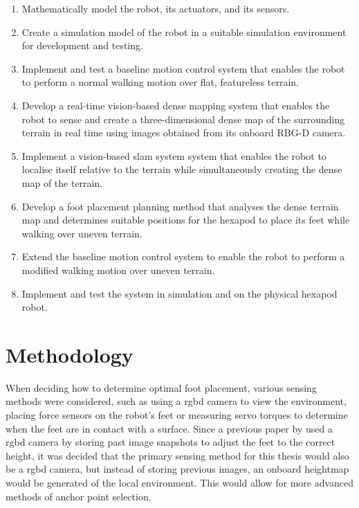     \begin{enumerate}
        \item Mathematically model the robot, its actuators, and its sensors.
        \item Create a simulation model of the robot in a suitable simulation environment for development and testing.
        \item Implement and test a baseline motion control system that enables the robot to
        perform a normal walking motion over flat, featureless terrain.
        \item Develop a real-time vision-based dense mapping system that enables the robot to sense and create a three-dimensional 
        dense map of the surrounding terrain in real time using images obtained from its onboard RBG-D camera.
        \item Implement a vision-based \ac{slam} system system that enables the robot to localise itself relative to the terrain
        while simultaneously creating the dense map of the terrain.
        \item Develop a foot placement planning method that analyses the dense terrain map and determines suitable positions
        for the hexapod to place its feet while walking over uneven terrain.
        \item Extend the baseline motion control system to enable the robot to perform a modified walking motion over uneven terrain.
        \item Implement and test the system in simulation and on the physical hexapod robot.
    \end{enumerate}


\section{Methodology}
    When deciding how to determine optimal foot placement, various sensing methods were considered, such as using a \ac{rgbd} camera to view the environment,
    placing force sensors on the robot's feet or measuring servo torques to determine when the feet are in contact with a surface. Since a previous paper by \cite{erasmus2023guidance} used a \ac{rgbd} camera
    by storing past image snapshots to adjust the feet to the correct height, it was decided that the primary sensing method for this thesis would also be a \ac{rgbd} camera, but instead of storing previous images,
    an onboard heightmap would be generated of the local environment. This would allow for more advanced methods of anchor point selection.

